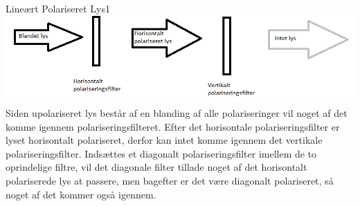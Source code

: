 \begin{opgave}{Lineært Polariseret Lys}{1}
\includegraphics[width = \textwidth]{elektrodynamik/polskitse.png}
\opg Siden upolariseret lys består af en blanding af alle polariseringer vil noget af det komme igennem polariseringsfilteret.
\opg Efter det horisontale polariseringsfilter er lyset horisontalt polariseret, derfor kan intet komme igennem det vertikale polariseringsfilter.
\opg Indsættes et diagonalt polariseringsfilter imellem de to oprindelige filtre, vil det diagonale filter tillade noget af det horisontalt polariserede lys at passere, men bagefter er det være diagonalt polariseret, så noget af det kommer også igennem.
\end{opgave}

